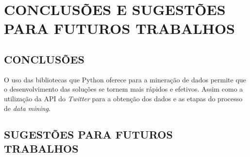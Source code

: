 \chapter{CONCLUSÕES E SUGESTÕES PARA FUTUROS TRABALHOS}\label{ch:conclusao}
\section{CONCLUSÕES} 
O uso das bibliotecas que Python oferece para a mineração de dados permite que o desenvolvimento das soluções se tornem mais rápidos e efetivos. Assim como a utilização da API do \textit{Twitter} para a obtenção dos dados e as etapas do processo de \textit{data mining}. 


\section{SUGESTÕES PARA FUTUROS TRABALHOS}